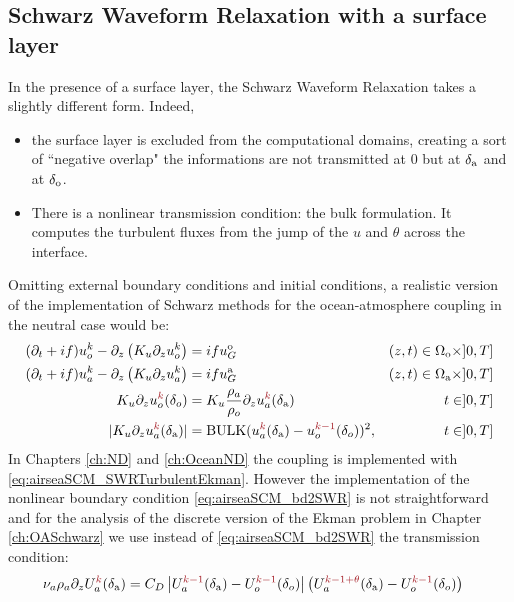 \subsection{Schwarz Waveform Relaxation with a surface layer}
In the presence of a surface layer, the Schwarz Waveform Relaxation
takes a slightly different form.
Indeed, 
\begin{itemize}
\item the surface layer is excluded from the computational domains,
creating a sort of ``negative overlap" the informations are
not transmitted at 0 but at $\delta_{\rm a}$ and at $\delta_{\rm o}$.
\item There is a nonlinear transmission condition: the bulk
formulation. It computes the turbulent fluxes from the jump of
the $u$ and $\theta$ across the interface.
\end{itemize}
\par
Omitting external boundary conditions and initial conditions,
a realistic version of the implementation of Schwarz methods for
the ocean-atmosphere coupling in the neutral case would be:
\begin{subequations}
\begin{align}
(\partial_t+if) u_o^k - \partial_z \left(K_u \partial_z u_o^k\right)
	&= if u_G^{\rm o}  & (z,t) \in \Omega_{\rm o} \times ]0,T] \label{eq:airseaSCM_dr1_final} \\
(\partial_t+if) u_a^k - \partial_z \left(K_u \partial_z u_a^k\right)
	&= if u_G^{\rm a}  & (z,t) \in \Omega_{\rm a} \times ]0,T] \label{eq:airseaSCM_dr2_final} \\
	K_u \partial_z u_o^{\emphase{k}}(\delta_o) &=
	K_u \frac{\rho_a}{\rho_o} \partial_z u_a^{\emphase{k}}(\delta_{\rm a})
	& t \in ]0,T] \label{eq:airseaSCM_bd1} \\
	|K_u \partial_z u_a^{\emphase{k}}(\delta_{\rm a})|
	&= {\rm BULK}(u_a^{\emphase{k}}(\delta_{\rm a})
	-u_o^{\emphase{k-1}}(\delta_o))^2,
	& t \in ]0,T]\label{eq:airseaSCM_bd2SWR}
\end{align}
\label{eq:airseaSCM_SWRTurbulentEkman}
\end{subequations}
In Chapters \ref{ch:ND} and \ref{ch:OceanND} the coupling is
implemented with \eqref{eq:airseaSCM_SWRTurbulentEkman}.
However the implementation of the nonlinear boundary condition
\eqref{eq:airseaSCM_bd2SWR} is not straightforward and for the
analysis of the discrete version of the Ekman problem in Chapter
\ref{ch:OASchwarz} we use instead of \eqref{eq:airseaSCM_bd2SWR}
the transmission condition:
\begin{equation}
	\label{eq:airseaSCM_simplifiedBdCondForOASchwarz}
	\begin{aligned}
		\nu_a \rho_a \partial_z U_a^{\emphase{k}}(\delta_{\rm a})
		&= C_D \left|U_a^{\emphase{{k-1}}}(\delta_{\rm a})
		-U_o^{\emphase{k-1}}(\delta_o)\right|\left(U_a^{\emphase{{k-1+\theta}}}
		(\delta_{\rm a}) -U_o^{\emphase{k-1}}(\delta_o)\right)
	\end{aligned}
\end{equation}
